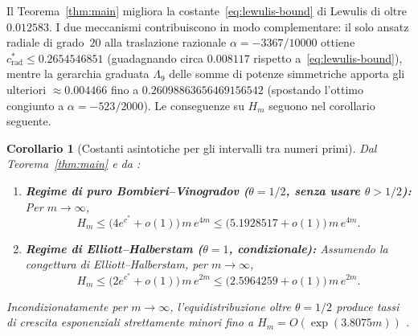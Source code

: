 \documentclass[11pt, reqno]{amsart}
\newtheorem{corollary}[theorem]{Corollario}
\theoremstyle{remark}
\numberwithin{equation}{section}
\begin{document}
Il Teorema~\ref{thm:main} migliora la costante~\eqref{eq:lewulis-bound} di Lewulis di oltre
$0.012583$. I due meccanismi contribuiscono in modo complementare:
il solo ansatz radiale di grado~$20$ alla traslazione razionale $\alpha = -3367/10000$ ottiene
$c_{\mathrm{rad}}^* \le 0.2654546851$ (guadagnando circa $0.008117$ rispetto a~\eqref{eq:lewulis-bound}),
mentre la gerarchia graduata $\Lambda_9$ delle somme di potenze simmetriche apporta gli ulteriori
$\approx 0.004466$ fino a $0.26098863656469156542$ (spostando l'ottimo congiunto a $\alpha = -523/2000$).
Le conseguenze su $H_m$ seguono nel corollario seguente.

\begin{corollary}[Costanti asintotiche per gli intervalli tra numeri primi]\label{cor:Hm}
Dal Teorema~\ref{thm:main} e da \cite[Teoremi~22 e~26]{PM8b}:
\begin{enumerate}
\item[(i)] \textbf{Regime di puro Bombieri--Vinogradov ($\theta = 1/2$, senza usare $\theta > 1/2$):}
Per $m \to \infty$,
\[
H_m \le \bigl(4 e^{c^*} + o(1)\bigr)\,m\,e^{4m} \le \bigl(5.1928517 + o(1)\bigr)\,m\,e^{4m}.
\]
\item[(ii)] \textbf{Regime di Elliott--Halberstam ($\theta = 1$, condizionale):} Assumendo la
congettura di Elliott--Halberstam, per $m \to \infty$,
\[
H_m \le \bigl(2 e^{c^*} + o(1)\bigr)\,m\,e^{2m} \le \bigl(2.5964259 + o(1)\bigr)\,m\,e^{2m}.
\]
\end{enumerate}
Incondizionatamente per $m \to \infty$, l'equidistribuzione oltre $\theta = 1/2$ \cite{PM8b, Stadlmann2025}
produce tassi di crescita esponenziali strettamente minori fino a $H_m = O(\exp(3.8075 m))$ \cite{Stadlmann2025}.
\end{corollary}
\end{document}
